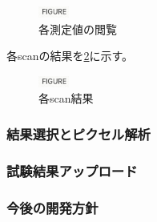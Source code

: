 \begin{figure}[bpt]\centering
\includegraphics[width=1cm]{figure}
\caption[各測定値の閲覧]{各測定値の閲覧}
\label{view_dcs}
\end{figure}

各scanの結果を\ref{scan_result}に示す。

\begin{figure}[bpt]\centering
\includegraphics[width=1cm]{figure}
\caption[各scan結果]{各scan結果}
\label{scan_result}
\end{figure}

\subsubsection{結果選択とピクセル解析}

\subsubsection{試験結果アップロード}

\subsubsection{今後の開発方針}


